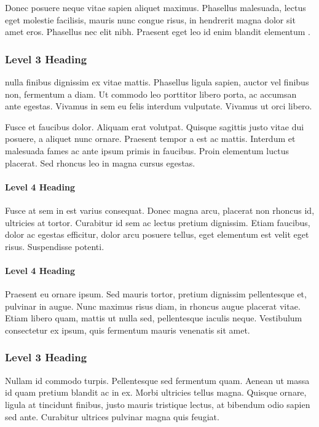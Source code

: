 \documentclass[a4paper,12pt,stu,donotrepeattitle,floatsintext,twoside]{apa7}
\begin{document}
Donec posuere neque vitae sapien aliquet maximus. Phasellus malesuada, lectus eget molestie facilisis, mauris nunc congue risus, in hendrerit magna dolor sit amet eros. Phasellus nec elit nibh. Praesent eget leo id enim blandit elementum \parencite{Marshetal2009}.

\subsubsection{Level 3 Heading}

\textcite{Marshetal2009} nulla finibus dignissim ex vitae mattis. Phasellus ligula sapien, auctor vel finibus non, fermentum a diam. Ut commodo leo porttitor libero porta, ac accumsan ante egestas. Vivamus in sem eu felis interdum vulputate. Vivamus ut orci libero.

Fusce et faucibus dolor. Aliquam erat volutpat. Quisque sagittis justo vitae dui posuere, a aliquet nunc ornare. Praesent tempor a est ac mattis. Interdum et malesuada fames ac ante ipsum primis in faucibus. Proin elementum luctus placerat. Sed rhoncus leo in magna cursus egestas.

\paragraph{Level 4 Heading}

Fusce at sem in est varius consequat. Donec magna arcu, placerat non rhoncus id, ultricies at tortor. Curabitur id sem ac lectus pretium dignissim. Etiam faucibus, dolor ac egestas efficitur, dolor arcu posuere tellus, eget elementum est velit eget risus. Suspendisse potenti.

\paragraph{Level 4 Heading}

Praesent eu ornare ipsum. Sed mauris tortor, pretium dignissim pellentesque et, pulvinar in augue. Nunc maximus risus diam, in rhoncus augue placerat vitae. Etiam libero quam, mattis ut nulla sed, pellentesque iaculis neque. Vestibulum consectetur ex ipsum, quis fermentum mauris venenatis sit amet.

\subsubsection{Level 3 Heading}

Nullam id commodo turpis. Pellentesque sed fermentum quam. Aenean ut massa id quam pretium blandit ac in ex. Morbi ultricies tellus magna. Quisque ornare, ligula at tincidunt finibus, justo mauris tristique lectus, at bibendum odio sapien sed ante. Curabitur ultrices pulvinar magna quis feugiat.
\end{document}
